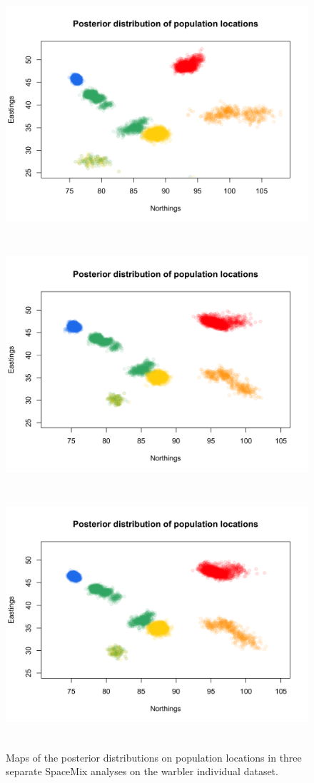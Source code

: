 \documentclass[12pt]{article}
\begin{document}
\begin{figure}
	\centering
			{\includegraphics[width=5in,height=3.6in]{figs/warblers/warb_inds_ad_post_map_randpr2.png}}
			{\includegraphics[width=5in,height=3.6in]{figs/warblers/warb_inds_ad_post_map_realpr1.png}}
			{\includegraphics[width=5in,height=3.6in]{figs/warblers/warb_inds_ad_post_map_realpr2.png}}
	\caption{Maps of the posterior distributions on population locations in three separate SpaceMix analyses on the warbler individual dataset.}\label{sfig:warb_ind_clouds}
\end{figure}
\end{document}
